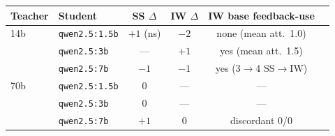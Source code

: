 \begin{tabular}{llcccc}
\toprule
Teacher & Student & SS $\Delta$ & IW $\Delta$ & IW base feedback-use \\
\midrule
14b   & \texttt{qwen2.5:1.5b} & $+1$ (ns) & $-2$ & none (mean att.\ 1.0) \\
      & \texttt{qwen2.5:3b}   & ---       & $+1$ & yes (mean att.\ 1.5) \\
      & \texttt{qwen2.5:7b}   & $-1$      & $-1$ & yes (3$\to$4 SS$\to$IW) \\
\midrule
70b   & \texttt{qwen2.5:1.5b} & $0$       & ---  & --- \\
      & \texttt{qwen2.5:3b}   & $0$       & ---  & --- \\
      & \texttt{qwen2.5:7b}   & $+1$      & $0$  & discordant 0/0 \\
\bottomrule
\end{tabular}

